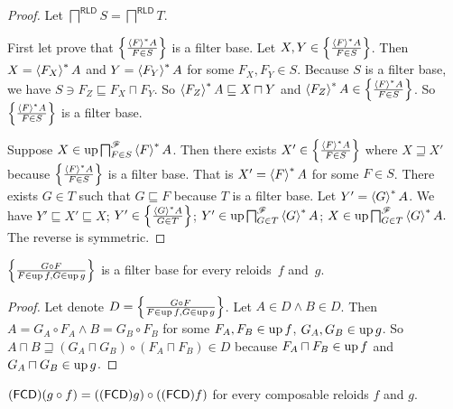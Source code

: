 \begin{proof}
Let $\bigsqcap^{\mathsf{RLD}}S=\bigsqcap^{\mathsf{RLD}}T$.

First let prove that $\left\{ \frac{\left\langle F\right\rangle ^{\ast}A}{F\in S}\right\}$ is a filter
base. Let $X,Y\in\left\{ \frac{\left\langle F\right\rangle ^{\ast}A}{F\in S}\right\}$. Then $X=\left\langle F_{X}\right\rangle ^{\ast}A$
and $Y=\left\langle F_{Y}\right\rangle ^{\ast}A$ for some $F_{X},F_{Y}\in S$. Because $S$
is a filter base, we have $S\ni F_{Z}\sqsubseteq F_{X}\sqcap F_{Y}$.
So $\left\langle F_{Z}\right\rangle ^{\ast}A\sqsubseteq X\sqcap Y$ and $\left\langle F_{Z}\right\rangle ^{\ast}A\in\left\{ \frac{\left\langle F\right\rangle ^{\ast}A}{F\in S}\right\}$.
So $\left\{ \frac{\left\langle F\right\rangle ^{\ast}A}{F\in S}\right\}$ is a filter base.

Suppose $X\in\operatorname{up}\bigsqcap_{F\in S}^{\mathscr{F}}\left\langle F\right\rangle ^{\ast}A$. Then there
exists $X'\in\left\{ \frac{\left\langle F\right\rangle ^{\ast}A}{F\in S}\right\}$ where $X\sqsupseteq X'$
because $\left\{ \frac{\left\langle F\right\rangle ^{\ast}A}{F\in S}\right\}$ is a filter base. That is
$X'=\left\langle F\right\rangle ^{\ast}A$ for some $F\in S$. There exists $G\in T$ such
that $G\sqsubseteq F$ because $T$ is a filter base. Let $Y'=\left\langle G\right\rangle ^{\ast}A$.
We have $Y'\sqsubseteq X'\sqsubseteq X$; $Y'\in\left\{ \frac{\left\langle G\right\rangle ^{\ast}A}{G\in T}\right\}$;
$Y'\in\operatorname{up}\bigsqcap_{G\in T}^{\mathscr{F}}\left\langle G\right\rangle ^{\ast}A$; $X\in\operatorname{up}\bigsqcap_{G\in T}^{\mathscr{F}}\left\langle G\right\rangle ^{\ast}A.$
The reverse is symmetric.\end{proof}
\begin{lem}
$\left\{ \frac{G\circ F}{F\in\operatorname{up} f,G\in\operatorname{up} g}\right\}$ is a filter base for every
reloids~$f$ and~$g$.\end{lem}
\begin{proof}
Let denote $D=\left\{ \frac{G\circ F}{F\in\operatorname{up} f,G\in\operatorname{up} g}\right\}$. Let $A\in D\land B\in D$.
Then $A=G_{A}\circ F_{A}\land B=G_{B}\circ F_{B}$ for some $F_{A},F_{B}\in\operatorname{up} f$,
$G_{A},G_{B}\in\operatorname{up} g$. So $A\sqcap B\sqsupseteq(G_{A}\sqcap G_{B})\circ(F_{A}\sqcap F_{B})\in D$
because $F_{A}\sqcap F_{B}\in\operatorname{up} f$ and $G_{A}\sqcap G_{B}\in\operatorname{up} g$.\end{proof}
\begin{thm}
$(\mathsf{FCD})(g\circ f)=((\mathsf{FCD}) g)\circ((\mathsf{FCD}) f)$ for every composable
reloids $f$ and $g$.\end{thm}
